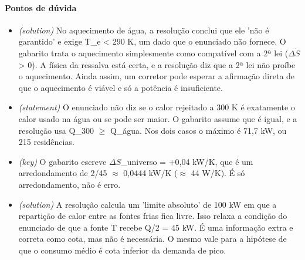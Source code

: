 \documentclass{article}%
\begin{document}
\paragraph{Pontos de dúvida}%
\begin{itemize}%
\item%
\textit{(solution)} No aquecimento de água, a resolução conclui que ele 'não é garantido' e exige T\_e < 290 K, um dado que o enunciado não fornece. O gabarito trata o aquecimento simplesmente como compatível com a 2ª lei ($\Delta$$\dot S$ > 0). A física da ressalva está certa, e a resolução diz que a 2ª lei não proíbe o aquecimento. Ainda assim, um corretor pode esperar a afirmação direta de que o aquecimento é viável e só a potência é insuficiente.%
\item%
\textit{(statement)} O enunciado não diz se o calor rejeitado a 300 K é exatamente o calor usado na água ou se pode ser maior. O gabarito assume que é igual, e a resolução usa Q\_300 $\geq$ Q\_água. Nos dois casos o máximo é 71,7 kW, ou 215 residências.%
\item%
\textit{(key)} O gabarito escreve $\Delta$$\dot S$\_universo = +0,04 kW/K, que é um arredondamento de 2/45 $\approx$ 0,0444 kW/K ($\approx$ 44 W/K). É só arredondamento, não é erro.%
\item%
\textit{(solution)} A resolução calcula um 'limite absoluto' de 100 kW em que a repartição de calor entre as fontes frias fica livre. Isso relaxa a condição do enunciado de que a fonte T recebe Q/2 = 45 kW. É uma informação extra e correta como cota, mas não é necessária. O mesmo vale para a hipótese de que o consumo médio é cota inferior da demanda de pico.%
\end{itemize}%
\end{document}
